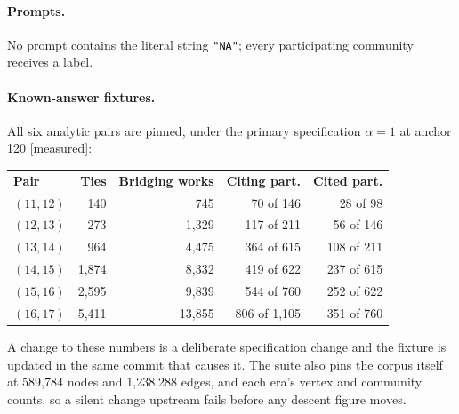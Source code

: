 \documentclass[11pt]{article}
\newcommand{\doublerule}{%
  \specialrule{\lightrulewidth}{0pt}{\doublerulesep}%
  \specialrule{\lightrulewidth}{0pt}{0pt}}
\newcommand{\meas}{{\footnotesize\textsf{[measured]}}}
\newcommand{\code}[1]{\texttt{\small #1}}
\begin{document}
\paragraph{Prompts.} No prompt contains the literal string \code{"NA"}; every participating
community receives a label.

\paragraph{Known-answer fixtures.} All six analytic pairs are pinned, under the primary
specification $\alpha = 1$ at anchor 120 \meas{}:

\begin{center}
\small
\begin{tabular}{@{}lrrrr@{}}
\toprule
\textbf{Pair} & \textbf{Ties} & \textbf{Bridging works} & \textbf{Citing part.} &
  \textbf{Cited part.}\\
\doublerule
$(11,12)$ &   140 &    745 &   70 of 146 &  28 of 98\\
$(12,13)$ &   273 &  1{,}329 &  117 of 211 &  56 of 146\\
$(13,14)$ &   964 &  4{,}475 &  364 of 615 & 108 of 211\\
$(14,15)$ & 1{,}874 &  8{,}332 &  419 of 622 & 237 of 615\\
$(15,16)$ & 2{,}595 &  9{,}839 &  544 of 760 & 252 of 622\\
$(16,17)$ & 5{,}411 & 13{,}855 &  806 of 1{,}105 & 351 of 760\\
\bottomrule
\end{tabular}
\end{center}

A change to these numbers is a deliberate specification change and the fixture is updated in
the same commit that causes it. The suite also pins the corpus itself at 589{,}784 nodes and
1{,}238{,}288 edges, and each era's vertex and community counts, so a silent change upstream
fails before any descent figure moves.
\end{document}
